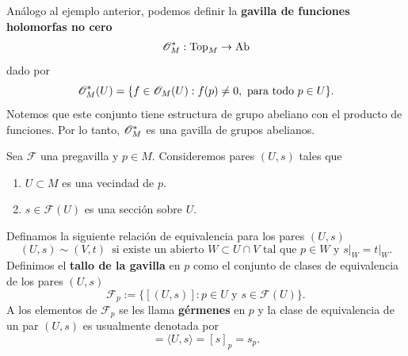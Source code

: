 \begin{example}
	Análogo al ejemplo anterior, podemos definir la \textbf{gavilla de funciones holomorfas no cero}
	\begin{equation*}
		\mathscr{O}_M^*:\mathrm{Top}_M\to \mathrm{Ab}
	\end{equation*}
	dado por
	\begin{equation*}
		\mathscr{O}_M^*(U)=\{f\in\mathscr{O}_M(U):f(p)\neq 0,\text{ para todo }p\in U\}.
	\end{equation*}
	Notemos que este conjunto tiene estructura de grupo abeliano con el producto de funciones. Por lo tanto, $\mathscr{O}_M^*$ es una gavilla de grupos abelianos.
\end{example}

\begin{definition}
	Sea $\mathscr{F}$ una pregavilla y $p\in M$. Consideremos pares $(U,s)$ tales que
	\begin{enumerate}
		\item $U\subset M$ es una vecindad de $p$.
		\item $s\in\mathscr{F}(U)$ es una sección sobre $U$.
	\end{enumerate}
	Definamos la siguiente relación de equivalencia para los pares $(U,s)$
	\begin{equation*}
		(U,s)\sim (V,t)\enspace\text{si existe un abierto }W\subset U\cap V\text{ tal que }p\in W\text{ y }s\left.\right|_W=t\left.\right|_W.
	\end{equation*}
	Definimos el \textbf{tallo de la gavilla} en $p$ como el conjunto de clases de equivalencia de los pares $(U,s)$
	\begin{equation*}
		\mathscr{F}_p:=\{[(U,s)]:p\in U\text{ y }s\in\mathscr{F}(U)\}.
	\end{equation*}
	A los elementos de $\mathscr{F}_p$ se les llama \textbf{gérmenes} en $p$ y la clase de equivalencia de un par $(U,s)$ es usualmente denotada por  
	\begin{equation*}
		[(U,s)]=\langle U,s \rangle = [s]_p = s_p.
	\end{equation*}
\end{definition}

